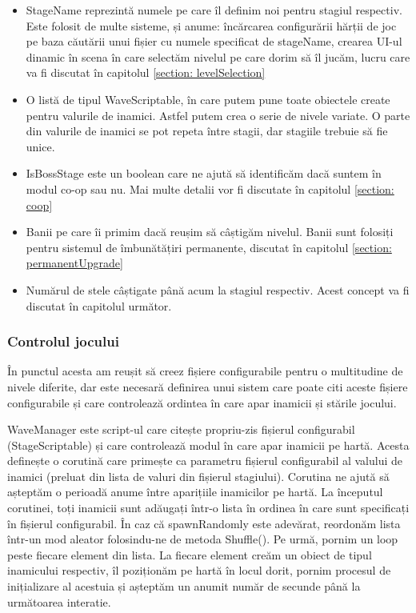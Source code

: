 \documentclass[12pt, a4paper]{article}
\begin{document}
	\begin{itemize}
		\item StageName reprezintă numele pe care îl definim noi pentru stagiul respectiv. Este folosit de multe sisteme, și anume: încărcarea configurării hărții de joc pe baza căutării unui fișier cu numele specificat de stageName, crearea UI-ul dinamic în scena în care selectăm nivelul pe care dorim să îl jucăm, lucru care va fi discutat în capitolul \ref{section: levelSelection}
		\item O listă de tipul WaveScriptable, în care putem pune toate obiectele create pentru valurile de inamici. Astfel putem crea o serie de nivele variate. O parte din valurile de inamici se pot repeta între stagii, dar stagiile trebuie să fie unice.
		\item IsBossStage este un boolean care ne ajută să identificăm dacă suntem în modul co-op sau nu. Mai multe detalii vor fi discutate în capitolul \ref{section: coop} 
		\item Banii pe care îi primim dacă reușim să câștigăm nivelul. Banii sunt folosiți pentru sistemul de îmbunătățiri permanente, discutat în capitolul \ref{section: permanentUpgrade}
		\item Numărul de stele câștigate până acum la stagiul respectiv. Acest concept va fi discutat în capitolul următor.
	\end{itemize}
	
	
	
	
	
	\subsubsection{Controlul jocului}
	\label{section: gameState}
	
	În punctul acesta am reușit să creez fișiere configurabile pentru o multitudine de nivele diferite, dar este necesară definirea unui sistem care poate citi aceste fișiere configurabile și care controlează ordintea în care apar inamicii și stările jocului.
	\newline
	
	WaveManager este script-ul care citește propriu-zis fișierul configurabil (StageScriptable) și care controlează modul în care apar inamicii pe hartă. Acesta definește o corutină care primește ca parametru fișierul configurabil al valului de inamici (preluat din lista de valuri din fișierul stagiului). Corutina ne ajută să așteptăm o perioadă anume între aparițiile inamicilor pe hartă. La începutul corutinei, toți inamicii sunt adăugați într-o lista în ordinea în care sunt specificați în fișierul configurabil. În caz că spawnRandomly este adevărat, reordonăm lista într-un mod aleator folosindu-ne de metoda Shuffle(). Pe urmă, pornim un loop peste fiecare element din lista. La fiecare element creăm un obiect de tipul inamicului respectiv, îl poziționăm pe hartă în locul dorit, pornim procesul de inițializare al acestuia și așteptăm un anumit număr de secunde până la următoarea interatie.
	\newline
	
\end{document}
